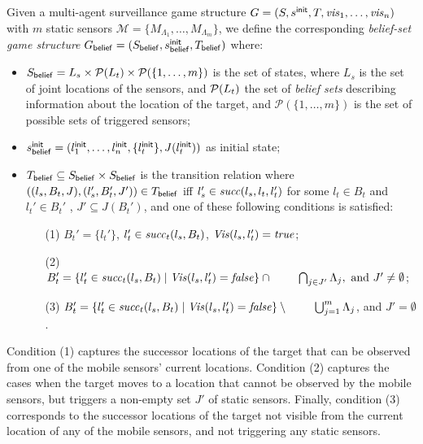 Given a  multi-agent surveillance game structure $G  = (S,s^{\mathsf{init}},T,\mathit{vis}_1,\ldots,\mathit{vis}_n)$ with $m$ static sensors $\mathcal{M} = \{M_{\Lambda_1},\dots,M_{\Lambda_m}\}$, we define the corresponding \emph{belief-set game structure} $G_{\mathsf{belief}}  = (S_{\mathsf{belief}},s^{\mathsf{init}}_{\mathsf{belief}},T_{\mathsf{belief}})$ where:
\begin{itemize}
\item $S_{\mathsf{belief}} = L_s \times \mathcal{P}(L_t)\times \mathcal{P}(\{1,\ldots,m\})$ is the set of states, where $L_s$ is the set of joint locations of the sensors, and $\mathcal{P}(L_t)$ the set of \emph{belief sets} describing information about the location of the target, and $\mathcal{P}(\{1,\ldots,m\})$ is the set of possible sets of triggered sensors;
\item $s^{\mathsf{init}}_{\mathsf{belief}} = (l^{\mathsf{init}}_1,\ldots,l^{\mathsf{init}}_n,\{l_t^{\mathsf{init}}\},J(l_t^{\mathsf{init}}))$ as initial state;
\item $T_{\mathsf{belief}} \subseteq S_{\mathsf{belief}} \times S_{\mathsf{belief}}$ is the transition relation where $((l_s, B_t,J),(l_s', B_t',J')) \in T_{\mathsf{belief}}$ iff $l_s' \in  \mathit{succ}(l_s,l_t,l_t')$ for some $l_t \in B_t$ and $l_t' \in B_t'$ , $J' \subseteq J(B_t')$, and one of these following conditions is satisfied:
\begin{itemize}
\item[(1)] $B_t' = \{l_t'\}$, $l_t' \in \mathit{succ}_t(l_s,B_t)$, $\mathit{Vis}(l_s,l_t') = \mathit{true}$;
\item[(2)] $B_t' = \{l_t' \in \mathit{succ}_t(l_s,B_t)  \mid  \mathit{Vis}(l_s,l_t') = \mathit{false} \} \cap \\
\phantom{B_t' = }\bigcap_{j\in J'}\Lambda_j, \text{ and } J' \neq \emptyset $;
\item[(3)] $B_t' = \{l_t' \in \mathit{succ}_t(l_s,B_t ) \mid  \mathit{Vis}(l_s,l_t') = \mathit{false}\}\setminus\phantom{B_t' = }\bigcup_{j=1}^m \Lambda_j$, and $J' = \emptyset$.
\end{itemize}
\end{itemize}
Condition (1) captures the successor locations of the target that can be observed from one of the mobile sensors' current locations. Condition (2) captures the cases when the target moves to a location that cannot be observed by the mobile sensors, but triggers a non-empty set $J'$ of static sensors. Finally, condition (3) corresponds to the successor locations of the target not visible from the current location of any of the mobile sensors, and not triggering any static sensors.
